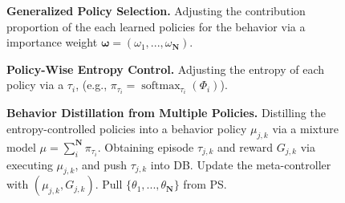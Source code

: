 \begin{figure}[ht]
\begin{minipage}{\linewidth}
\begin{algorithm}[H]
\begin{algorithmic}
            \STATE \textbf{Generalized Policy Selection.} Adjusting the contribution proportion of the each learned policies for the behavior via a importance weight $\bm{\omega}=(\omega_1,...,\omega_{\mathbf{N}})$.
            
            \STATE \textbf{Policy-Wise Entropy Control.} Adjusting  the entropy of each policy via a $\tau_i$, (e.g., $\pi_{\tau_i}=\operatorname{softmax}_{\tau_i}(\Phi_i)$).
            
            \STATE \textbf{Behavior Distillation from 
            Multiple Policies.} Distilling the entropy-controlled policies into a behavior policy $\mu_{j,k}$ via a mixture model $\mu=\sum_i^{\mathbf{N}} \pi_{\tau_i}$. 
            \STATE Obtaining episode $\tau_{j,k}$ and reward $G_{j,k}$ via executing $\mu_{j,k}$, and push $\tau_{j,k}$ into  DB.
            \STATE Update the meta-controller  with $(\mu_{j,k},G_{j,k})$.
          \STATE Pull $\{\theta_1,...,\theta_\mathbf{N}\}$ from PS.
          \ENDIF
        \ENDFOR
          \end{algorithmic}
        \label{app alg:LBC}
    \end{algorithm}
  \end{minipage}
\end{figure}

\clearpage


